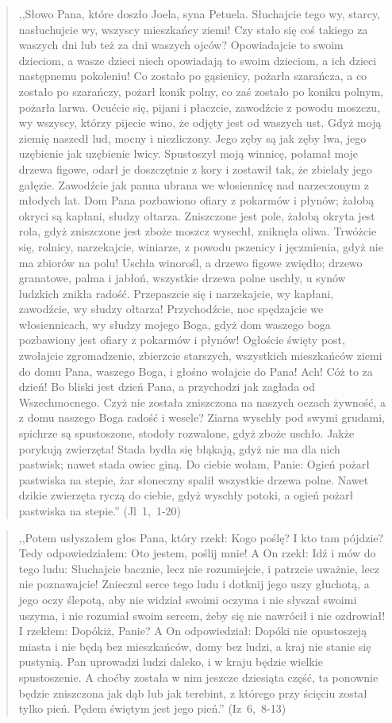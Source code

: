 \documentclass[10pt,a4paper,oneside]{article}
\begin{document}
\begin{quote}
,,Słowo Pana, które doszło Joela, syna Petuela. Słuchajcie tego wy, starcy, nasłuchujcie wy, wszyscy mieszkańcy ziemi! Czy stało się coś takiego za waszych dni lub też za dni waszych ojców? Opowiadajcie to swoim dzieciom, a wasze dzieci niech opowiadają to swoim dzieciom, a ich dzieci następnemu pokoleniu! Co zostało po gąsienicy, pożarła szarańcza, a co zostało po szarańczy, pożarł konik polny, co zaś zostało po koniku polnym, pożarła larwa. Ocućcie się, pijani i płaczcie, zawodźcie z powodu moszczu, wy wszyscy, którzy pijecie wino, że odjęty jest od waszych ust. Gdyż moją ziemię naszedł lud, mocny i niezliczony. Jego zęby są jak zęby lwa, jego uzębienie jak uzębienie lwicy. Spustoszył moją winnicę, połamał moje drzewa figowe, odarł je doszczętnie z kory i zostawił tak, że zbielały jego gałęzie. Zawodźcie jak panna ubrana we włosiennicę nad narzeczonym z młodych lat. Dom Pana pozbawiono ofiary z pokarmów i płynów; żałobą okryci są kapłani, słudzy ołtarza. Zniszczone jest pole, żałobą okryta jest rola, gdyż zniszczone jest zboże moszcz wysechł, zniknęła oliwa. Trwóżcie się, rolnicy, narzekajcie, winiarze, z powodu pszenicy i jęczmienia, gdyż nie ma zbiorów na polu! Uschła winorośl, a drzewo figowe zwiędło; drzewo granatowe, palma i jabłoń, wszystkie drzewa polne uschły, u synów ludzkich znikła radość. Przepaszcie się i narzekajcie, wy kapłani, zawodźcie, wy słudzy ołtarza! Przychodźcie, noc spędzajcie we włosiennicach, wy słudzy mojego Boga, gdyż dom waszego boga pozbawiony jest ofiary z pokarmów i płynów! Ogłoście święty post, zwołajcie zgromadzenie, zbierzcie starszych, wszystkich mieszkańców ziemi do domu Pana, waszego Boga, i głośno wołajcie do Pana! Ach! Cóż to za dzień! Bo bliski jest dzień Pana, a przychodzi jak zagłada od Wszechmocnego. Czyż nie została zniszczona na naszych oczach żywność, a z domu naszego Boga radość i wesele? Ziarna wyschły pod swymi grudami, spichrze są spustoszone, stodoły rozwalone, gdyż zboże uschło. Jakże porykują zwierzęta! Stada bydła się błąkają, gdyż nie ma dla nich pastwisk; nawet stada owiec giną. Do ciebie wołam, Panie: Ogień pożarł pastwiska na stepie, żar słoneczny spalił wszystkie drzewa polne. Nawet dzikie zwierzęta ryczą do ciebie, gdyż wyschły potoki, a ogień pożarł pastwiska na stepie.'' (Jl~1,~1-20)
\end{quote}
\begin{quote}
,,Potem usłyszałem głos Pana, który rzekł: Kogo poślę? I kto tam pójdzie? Tedy odpowiedziałem: Oto jestem, poślij mnie! A On rzekł: Idź i mów do tego ludu: Słuchajcie bacznie, lecz nie rozumiejcie, i patrzcie uważnie, lecz nie poznawajcie! Znieczul serce tego ludu i dotknij jego uszy głuchotą, a jego oczy ślepotą, aby nie widział swoimi oczyma i nie słyszał swoimi uszyma, i nie rozumiał swoim sercem, żeby się nie nawrócił i nie ozdrowiał! I rzekłem: Dopókiż, Panie? A On odpowiedział: Dopóki nie opustoszeją miasta i nie będą bez mieszkańców, domy bez ludzi, a kraj nie stanie się pustynią. Pan uprowadzi ludzi daleko, i w kraju będzie wielkie spustoszenie. A choćby została w nim jeszcze dziesiąta część, ta ponownie będzie zniszczona jak dąb lub jak terebint, z którego przy ścięciu został tylko pień. Pędem świętym jest jego pień.'' (Iz~6,~8-13)
\end{quote}
\end{document}
